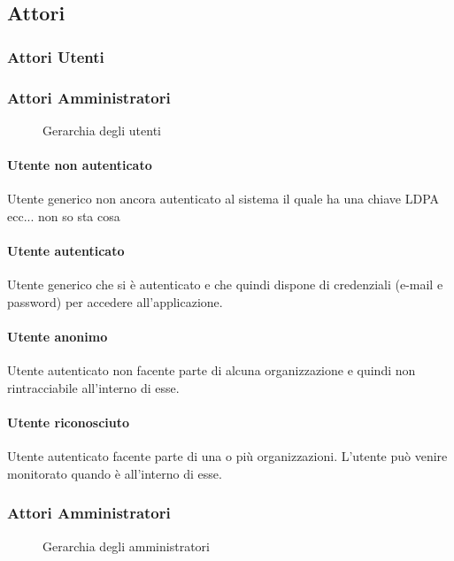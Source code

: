 \subsection{Attori}
\subsubsection{Attori Utenti}

\subsubsection{Attori Amministratori}
\begin{figure}[h]
  \caption{Gerarchia degli utenti}
  \centering
\end{figure}

\paragraph{Utente non autenticato}
Utente generico non ancora autenticato al sistema il quale ha una chiave LDPA ecc... non so sta cosa
\paragraph{Utente autenticato}
Utente generico che si è autenticato e che quindi dispone di credenziali (e-mail e password) per accedere all'applicazione.
\paragraph{Utente anonimo}
Utente autenticato non facente parte di alcuna organizzazione e quindi non rintracciabile all'interno di esse.

\paragraph{Utente riconosciuto}
Utente autenticato facente parte di una o più organizzazioni.
L'utente può venire monitorato quando è all'interno di esse.



\subsubsection{Attori Amministratori}
\begin{figure}[h]
  \caption{Gerarchia degli amministratori}
  \centering
\end{figure}



